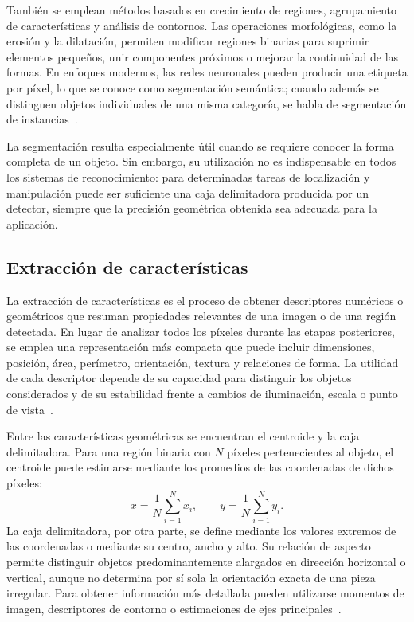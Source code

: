 También se emplean métodos basados en crecimiento de regiones, agrupamiento de características y análisis de contornos. Las operaciones morfológicas, como la erosión y la dilatación, permiten modificar regiones binarias para suprimir elementos pequeños, unir componentes próximos o mejorar la continuidad de las formas. En enfoques modernos, las redes neuronales pueden producir una etiqueta por píxel, lo que se conoce como segmentación semántica; cuando además se distinguen objetos individuales de una misma categoría, se habla de segmentación de instancias~\cite{gonzalez2018digital,szeliski2022computer}.

La segmentación resulta especialmente útil cuando se requiere conocer la forma completa de un objeto. Sin embargo, su utilización no es indispensable en todos los sistemas de reconocimiento: para determinadas tareas de localización y manipulación puede ser suficiente una caja delimitadora producida por un detector, siempre que la precisión geométrica obtenida sea adecuada para la aplicación.

\subsection{Extracción de características}
La extracción de características es el proceso de obtener descriptores numéricos o geométricos que resuman propiedades relevantes de una imagen o de una región detectada. En lugar de analizar todos los píxeles durante las etapas posteriores, se emplea una representación más compacta que puede incluir dimensiones, posición, área, perímetro, orientación, textura y relaciones de forma. La utilidad de cada descriptor depende de su capacidad para distinguir los objetos considerados y de su estabilidad frente a cambios de iluminación, escala o punto de vista~\cite{gonzalez2018digital,szeliski2022computer}.

Entre las características geométricas se encuentran el centroide y la caja delimitadora. Para una región binaria con $N$ píxeles pertenecientes al objeto, el centroide puede estimarse mediante los promedios de las coordenadas de dichos píxeles:
\begin{equation}
    \bar{x}=\frac{1}{N}\sum_{i=1}^{N}x_i,
    \qquad
    \bar{y}=\frac{1}{N}\sum_{i=1}^{N}y_i.
\end{equation}
La caja delimitadora, por otra parte, se define mediante los valores extremos de las coordenadas o mediante su centro, ancho y alto. Su relación de aspecto permite distinguir objetos predominantemente alargados en dirección horizontal o vertical, aunque no determina por sí sola la orientación exacta de una pieza irregular. Para obtener información más detallada pueden utilizarse momentos de imagen, descriptores de contorno o estimaciones de ejes principales~\cite{gonzalez2018digital}.

